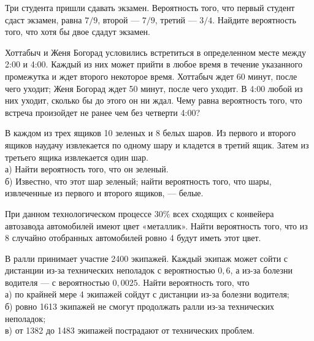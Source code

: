 \newpage\setcounter{zad}{0}



\begin{zkrW}{20}\noindent 
	Три студента пришли сдавать экзамен. Вероятность того, что первый студент сдаст экзамен, равна $7/9$, второй --- $7/9$, третий --- $3/4$. Найдите вероятность того, что хотя бы двое сдадут экзамен.
 
\end{zkrW}

\begin{zkrW}{20}\noindent 
	Хоттабыч и Женя Богорад условились встретиться в определенном месте между 2:00 и 4:00. Каждый из них может прийти в любое время в течение указанного промежутка и ждет второго некоторое время. Хоттабыч ждет 60 минут, после чего уходит; Женя Богорад ждет 50 минут, после чего уходит. В 4:00 любой из них уходит, сколько бы до этого он ни ждал. Чему равна вероятность того, что встреча произойдет не ранее чем без четверти 4:00?
 
\end{zkrW}

\begin{zkrW}{20}\noindent 
	В каждом из трех ящиков 10 зеленых и 8 белых шаров. Из первого и второго ящиков наудачу извлекается по одному шару и кладется в третий ящик. Затем из третьего ящика извлекается один шар. \\ \indent а) Найти вероятность того, что он зеленый. \\ \indent б) Известно, что этот шар зеленый; найти вероятность того, что шары, извлеченные из первого и второго ящиков, --- белые.
 
\end{zkrW}

\begin{zkrW}{20}\noindent 
	При данном технологическом процессе $30\%$ всех сходящих с конвейера автозавода автомобилей имеют цвет «металлик». Найти вероятность того, что из 8 случайно отобранных автомобилей ровно 4 будут иметь этот цвет.
 
\end{zkrW}

\begin{zkrW}{20}\noindent 
	В ралли принимает участие 2400 экипажей. Каждый экипаж может сойти с дистанции из-за технических неполадок с вероятностью $0{,}6$, а из-за болезни водителя --- с вероятностью $0{,}0025$. Найти вероятность того, что \\ \indent а) по крайней мере 4 экипажей сойдут с дистанции из-за болезни водителя; \\ \indent б) ровно 1613 экипажей не смогут продолжать ралли из-за технических неполадок; \\ \indent в) от 1382 до 1483 экипажей пострадают от технических проблем.
 
\end{zkrW}

